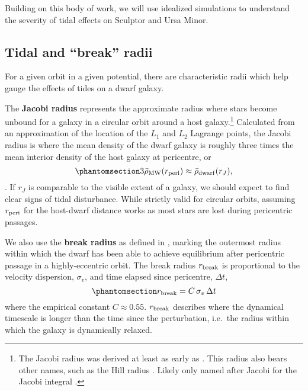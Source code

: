 Building on this body of work, we will use idealized simulations to
understand the severity of tidal effects on Sculptor and Ursa Minor.

\subsection{Tidal and ``break'' radii}\label{sec:break_radii}

For a given orbit in a given potential, there are characteristic radii
which help gauge the effects of tides on a dwarf galaxy.

The \textbf{Jacobi radius} represents the approximate radius where stars
become unbound for a galaxy in a circular orbit around a host
galaxy.\footnote{The Jacobi radius was derived at least as early as
  \citet{laplace1798}. This radius also bears other names, such as the
  Hill radius \citep[from][]{hill1878}. Likely only named after Jacobi
  for the Jacobi integral \citep{jacobi1836}.} Calculated from an
approximation of the location of the \(L_1\) and \(L_2\) Lagrange
points, the Jacobi radius is where the mean density of the dwarf galaxy
is roughly three times the mean interior density of the host galaxy at
pericentre, or
\begin{equation}\protect\phantomsection\label{eq:r_jacobi}{
3\bar \rho_{\rm MW}(r_{\rm peri}) \approx \bar \rho_{\rm dwarf}(r_J),
}\end{equation} \citep[ eq. 7-84]{BT1987}. If \(r_J\) is comparable to
the visible extent of a galaxy, we should expect to find clear signs of
tidal disturbance. While strictly valid for circular orbits, assuming
\(r_{\rm peri}\) for the host-dwarf distance works as most stars are
lost during pericentric passages.

We also use the \textbf{break radius} as defined in
\citet{penarrubia+2009}, marking the outermost radius within which the
dwarf has been able to achieve equilibrium after pericentric passage in
a highly-eccentric orbit. The break radius \(r_{\rm break}\) is
proportional to the velocity dispersion, \(\sigma_v\), and time elapsed
since pericentre, \(\Delta t\),
\begin{equation}\protect\phantomsection\label{eq:r_break}{
r_{\rm break} = C\,\sigma_{v}\,\Delta t
}\end{equation} where the empirical constant \(C \approx 0.55\).
\(r_{\rm break}\) describes where the dynamical timescale is longer than
the time since the perturbation, i.e.~the radius within which the galaxy
is dynamically relaxed.

